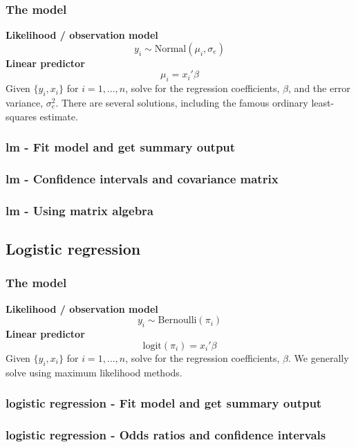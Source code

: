 \documentclass{beamer}
\begin{document}
\begin{frame}
    \frametitle{The model}
    \textbf{Likelihood / observation model}
    \[y_i \sim \text{Normal}(\mu_i, \sigma_e)\]
    \pause
    \textbf{Linear predictor}
    \[\mu_i = x_i' \beta\]
    \pause
    \bigskip
    Given $\{y_i, x_i\}$ for $i=1,...,n$, solve for the regression coefficients, $\beta$,
    and the error variance, $\sigma_e^2$.
    \bigskip
    \pause
    There are several solutions, including the famous ordinary least-squares estimate.
\end{frame}


\begin{frame}[fragile]
    \frametitle{lm - Fit model and get summary output}
    \fontsize{8}{10}\selectfont
    
\end{frame}


\begin{frame}[fragile]
    \frametitle{lm - Confidence intervals and covariance matrix}
    \fontsize{9}{11}\selectfont
    
\end{frame}


\begin{frame}[fragile]
    \frametitle{lm - Using matrix algebra}
    \fontsize{9}{11}\selectfont
    
\end{frame}


\subsection{Logistic regression}

\begin{frame}
    \frametitle{The model}
    \textbf{Likelihood / observation model}
    \[y_i \sim \text{Bernoulli}(\pi_i)\]
    \pause
    \textbf{Linear predictor}
    \[\text{logit}(\pi_i) = x_i' \beta\]
    \pause
    \bigskip
    Given $\{y_i, x_i\}$ for $i=1,...,n$, solve for the regression coefficients, $\beta$.
    \bigskip
    \pause
    We generally solve using maximum likelihood methods.
\end{frame}


\begin{frame}[fragile]
    \frametitle{logistic regression - Fit model and get summary output}
    \fontsize{8}{10}\selectfont
    
\end{frame}


\begin{frame}[fragile]
    \frametitle{logistic regression - Odds ratios and confidence intervals}
    \fontsize{9}{11}\selectfont
    
\end{frame}
\end{document}
